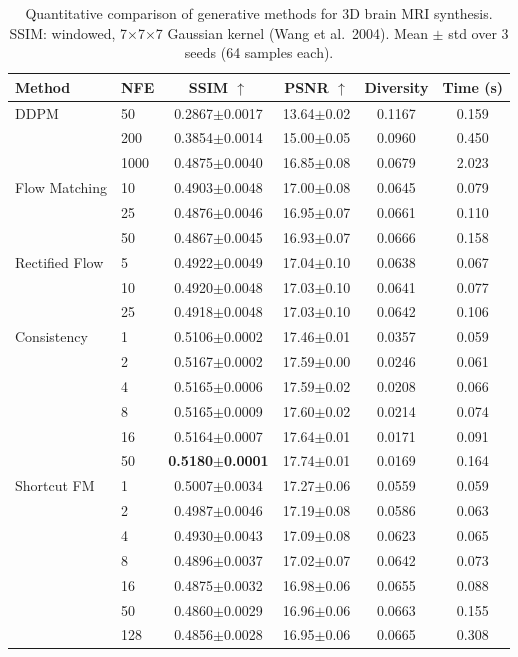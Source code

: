 \begin{table}[t]
\centering
\caption{Quantitative comparison of generative methods for 3D brain MRI synthesis.
SSIM: windowed, 7$\times$7$\times$7 Gaussian kernel (Wang et al.\ 2004).
Mean $\pm$ std over 3 seeds (64 samples each).}
\label{tab:main_results}
\begin{tabular}{llcccc}
\toprule
Method & NFE & SSIM $\uparrow$ & PSNR $\uparrow$ & Diversity & Time (s) \\
\midrule
DDPM & 50 & 0.2867$\pm$0.0017 & 13.64$\pm$0.02 & 0.1167 & 0.159 \\
 & 200 & 0.3854$\pm$0.0014 & 15.00$\pm$0.05 & 0.0960 & 0.450 \\
 & 1000 & 0.4875$\pm$0.0040 & 16.85$\pm$0.08 & 0.0679 & 2.023 \\
\midrule
Flow Matching & 10 & 0.4903$\pm$0.0048 & 17.00$\pm$0.08 & 0.0645 & 0.079 \\
 & 25 & 0.4876$\pm$0.0046 & 16.95$\pm$0.07 & 0.0661 & 0.110 \\
 & 50 & 0.4867$\pm$0.0045 & 16.93$\pm$0.07 & 0.0666 & 0.158 \\
\midrule
Rectified Flow & 5 & 0.4922$\pm$0.0049 & 17.04$\pm$0.10 & 0.0638 & 0.067 \\
 & 10 & 0.4920$\pm$0.0048 & 17.03$\pm$0.10 & 0.0641 & 0.077 \\
 & 25 & 0.4918$\pm$0.0048 & 17.03$\pm$0.10 & 0.0642 & 0.106 \\
\midrule
Consistency & 1 & 0.5106$\pm$0.0002 & 17.46$\pm$0.01 & 0.0357 & 0.059 \\
 & 2 & 0.5167$\pm$0.0002 & 17.59$\pm$0.00 & 0.0246 & 0.061 \\
 & 4 & 0.5165$\pm$0.0006 & 17.59$\pm$0.02 & 0.0208 & 0.066 \\
 & 8 & 0.5165$\pm$0.0009 & 17.60$\pm$0.02 & 0.0214 & 0.074 \\
 & 16 & 0.5164$\pm$0.0007 & 17.64$\pm$0.01 & 0.0171 & 0.091 \\
 & 50 & \textbf{0.5180$\pm$0.0001} & 17.74$\pm$0.01 & 0.0169 & 0.164 \\
\midrule
Shortcut FM & 1 & 0.5007$\pm$0.0034 & 17.27$\pm$0.06 & 0.0559 & 0.059 \\
 & 2 & 0.4987$\pm$0.0046 & 17.19$\pm$0.08 & 0.0586 & 0.063 \\
 & 4 & 0.4930$\pm$0.0043 & 17.09$\pm$0.08 & 0.0623 & 0.065 \\
 & 8 & 0.4896$\pm$0.0037 & 17.02$\pm$0.07 & 0.0642 & 0.073 \\
 & 16 & 0.4875$\pm$0.0032 & 16.98$\pm$0.06 & 0.0655 & 0.088 \\
 & 50 & 0.4860$\pm$0.0029 & 16.96$\pm$0.06 & 0.0663 & 0.155 \\
 & 128 & 0.4856$\pm$0.0028 & 16.95$\pm$0.06 & 0.0665 & 0.308 \\
\bottomrule
\end{tabular}
\end{table}